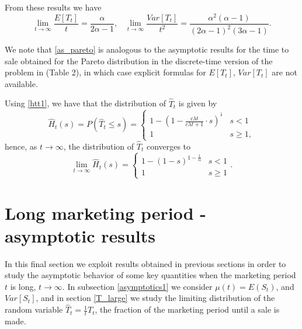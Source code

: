 \documentclass{article}
\numberwithin{equation}{section}
\begin{document}

From these results we have
\begin{equation}\label{as_pareto}\lim_{t\rightarrow \infty}\frac{E[T_t]}{t}= \frac{\alpha}{2\alpha-1},\;\;\;\lim_{t\rightarrow \infty}\frac{Var[T_t]}{t^2}=\frac{\alpha^2(\alpha-1)}{(2\alpha-1)^2(3\alpha-1)}.
\end{equation}

We note that \eqref{as_pareto} is analogous to the asymptotic results for the time to sale obtained for the Pareto distribution in the discrete-time version of the problem in \cite{entwistle}
(Table 2), in which case explicit formulas for $E[T_t]$, $Var[T_t]$ are not 
available.

Using \eqref{htt1}, we have that the distribution of 
$\hat{T}_t$ is given by
$$\hat{H}_t(s)=P(\hat{T}_t\leq s)=\begin{cases}
1-\left(1-\frac{c \lambda t }{ c  \lambda t+1}\cdot s \right)^{^{\frac{1}{c}}} & s<1\\
1 & s\geq 1,
\end{cases}$$
hence, as $t\rightarrow \infty$, the distribution of  $\hat{T}_t$ converges to 
\begin{equation}\label{limH3}\lim_{t\rightarrow\infty}\hat{H}_t(s)=\begin{cases}
1-(1-s)^{1-\frac{1}{\alpha}} & s<1\\
1 & s\geq 1
\end{cases}.\end{equation}


\section{Long marketing period - asymptotic results}
\label{asy}

In this final section we 
exploit results obtained in previous sections in order to study the 
asymptotic behavior of some key 
quantities when the marketing period $t$ is long, $t\rightarrow \infty$. In subsection 
\ref{asymptotics1} we consider 
$\mu(t)=E(S_t)$, and $Var[S_t]$, and 
in section \ref{T_large} we study the limiting distribution of the random variable $\hat{T}_t=\frac{1}{t}T_t$, the fraction of the marketing period until a sale is made.
\end{document}
